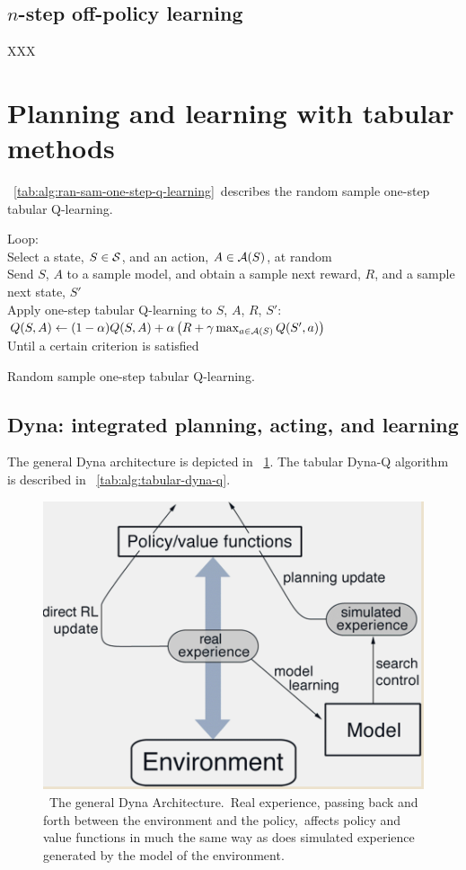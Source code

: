 \subsection{$n$-step off-policy learning}

XXX



\section{Planning and learning with tabular methods}

\tablename~\ref{tab:alg:ran-sam-one-step-q-learning}\ describes the random sample one-step tabular Q-learning.

\begin{table}
\beginalg
Loop:\\
\> Select a state, $S\in\mathcal{S}$, and an action, $A\in\mathcal{A}(S)$, at random\\
\> Send $S$, $A$ to a sample model, and obtain
a sample next reward, $R$, and a sample next state, $S'$\\
\> Apply one-step tabular Q-learning to $S$, $A$, $R$, $S'$:\\
\> \> $Q(S,A) \leftarrow (1-\alpha) Q(S,A) + \alpha \left( R + \gamma \max_{a\in\mathcal{A}(S)}Q(S',a) \right)$\\
Until a certain criterion is satisfied
\endalg
\caption{Random sample one-step tabular Q-learning.}
\label{tab:alg:ran-sam-one-step-q-learning}
\end{table}


\subsection{Dyna: integrated planning, acting, and learning}

The general Dyna architecture is depicted in \figurename~\ref{fig:dyna-architecture}.
The tabular Dyna-Q algorithm is described in \tablename~\ref{tab:alg:tabular-dyna-q}.


\begin{figure}
\begin{center}
\includegraphics[width=.5\textwidth]{figures/dyna-architecture}
\end{center}
\caption{\
The general Dyna Architecture.\
Real experience, passing back and forth between the environment and the policy,\
affects policy and value functions in much the same way as does simulated experience generated by the model of the environment.\
}
\label{fig:dyna-architecture}
\end{figure}


